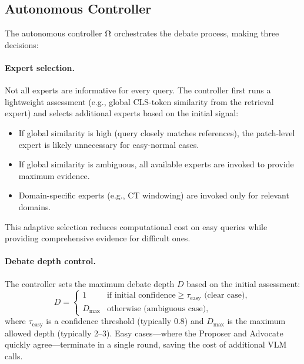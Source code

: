 \subsection{Autonomous Controller}
\label{sec:controller}

The autonomous controller $\Omega$ orchestrates the debate process, making three decisions:

\paragraph{Expert selection.}
Not all experts are informative for every query.
The controller first runs a lightweight assessment (e.g., global CLS-token similarity from the retrieval expert) and selects additional experts based on the initial signal:
\begin{itemize}[leftmargin=*,itemsep=1pt]
    \item If global similarity is high (query closely matches references), the patch-level expert is likely unnecessary for easy-normal cases.
    \item If global similarity is ambiguous, all available experts are invoked to provide maximum evidence.
    \item Domain-specific experts (e.g., CT windowing) are invoked only for relevant domains.
\end{itemize}
This adaptive selection reduces computational cost on easy queries while providing comprehensive evidence for difficult ones.

\paragraph{Debate depth control.}
The controller sets the maximum debate depth $D$ based on the initial assessment:
\begin{equation}
    D = \begin{cases}
        1 & \text{if initial confidence} \geq \tau_{\text{easy}} \text{ (clear case)}, \\
        D_{\max} & \text{otherwise (ambiguous case)},
    \end{cases}
    \label{eq:depth}
\end{equation}
where $\tau_{\text{easy}}$ is a confidence threshold (typically 0.8) and $D_{\max}$ is the maximum allowed depth (typically 2--3).
Easy cases---where the Proposer and Advocate quickly agree---terminate in a single round, saving the cost of additional VLM calls.

